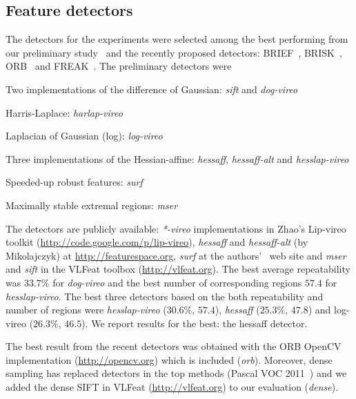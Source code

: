 \documentclass[10pt,journal,cspaper,compsoc]{IEEEtran}
\begin{document}
\subsection{Feature detectors}
%
The detectors for the experiments were selected among the
best performing from our preliminary
study~\cite{LanKanKam:2012} and the recently proposed
detectors: BRIEF~\cite{brief}, BRISK~\cite{brisk}, ORB~\cite{orb} and
FREAK~\cite{freak}. The preliminary detectors were
\begin{compactenum}
\item Two implementations of the difference of Gaussian: \textit{sift} and \textit{dog-vireo}
\item Harris-Laplace: \textit{harlap-vireo}
\item Laplacian of Gaussian (log): \textit{log-vireo}
\item Three implementations of the Hessian-affine: \textit{hessaff}, \textit{hessaff-alt} and \textit{hesslap-vireo} 
\item Speeded-up robust features: \textit{surf}
\item Maximally stable extremal regions: \textit{mser}
\end{compactenum}
The detectors are publicly available:
 \textit{*-vireo} implementations in Zhao's
Lip-vireo toolkit (\url{http://code.google.com/p/lip-vireo}),
\textit{hessaff} and \textit{hessaff-alt} (by Mikolajczyk) at
\url{http://featurespace.org}, \textit{surf} at the
authors'~\cite{BayEssTuy:2008} web site and \textit{mser} and \textit{sift} in
the VLFeat toolbox (\url{http://vlfeat.org}). 
The best average repeatability was $33.7\%$ for \textit{dog-vireo} and the
best number of corresponding regions $57.4$ for \textit{hesslap-vireo}. The
best three detectors based on the both repeatability and number of regions were
\textit{hesslap-vireo} ($30.6\%$, $57.4$), \textit{hessaff} ($25.3\%$, $47.8$) and
log-vireo ($26.3\%$, $46.5$). We report results for the best:
the hessaff detector.

The best result from the recent detectors was obtained with the ORB
OpenCV implementation (\url{http://opencv.org}) which is included
(\textit{orb}). Moreover,
dense sampling has replaced detectors in the top methods
(Pascal VOC 2011~\cite{VOC:2011}) and
we added the dense SIFT in VLFeat (\url{http://vlfeat.org})
to our evaluation (\textit{dense}).
\end{document}
